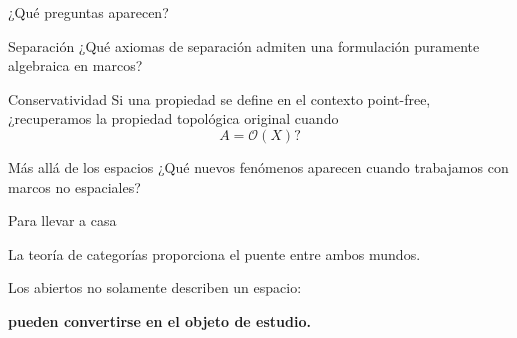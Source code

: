 \documentclass[compress,12pt]{beamer}
\begin{document}
\begin{frame}{¿Qué preguntas aparecen?}
\small

\begin{block}{Separación}
¿Qué axiomas de separación admiten una formulación
puramente algebraica en marcos?
\end{block}

\pause

\begin{block}{Conservatividad}
Si una propiedad se define en el contexto point-free,
¿recuperamos la propiedad topológica original cuando
\[
A=\mathcal O(X)?
\]
\end{block}

\pause

\begin{block}{Más allá de los espacios}
¿Qué nuevos fenómenos aparecen cuando trabajamos con
marcos no espaciales?
\end{block}

\end{frame}

\begin{frame}{Para llevar a casa}

\begin{center}


\medskip

\begin{minipage}{0.78\textwidth}
    \begin{block}{}
        \centering
        La teoría de categorías proporciona el puente
        entre ambos mundos.
    \end{block}
\end{minipage}

\pause

\bigskip

Los abiertos no solamente describen un espacio:

\medskip

{\Large
\textbf{pueden convertirse en el objeto de estudio.}
}

\end{center}

\end{frame}
\end{document}
